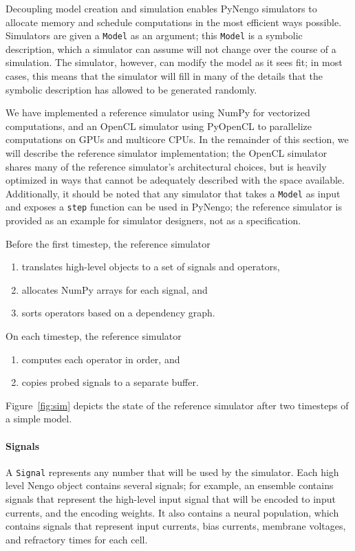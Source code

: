 \documentclass{frontiersSCNS}
\begin{document}
Decoupling model creation and simulation
enables PyNengo simulators
to allocate memory and schedule computations
in the most efficient ways possible.
Simulators are given a \texttt{Model}
as an argument;
this \texttt{Model} is a symbolic description,
which a simulator can assume will not change
over the course of a simulation.
The simulator, however,
can modify the model as it sees fit;
in most cases, this means that the simulator
will fill in many of the details
that the symbolic description
has allowed to be generated randomly.

We have implemented
a reference simulator using NumPy
for vectorized computations,
and an OpenCL simulator
using PyOpenCL to parallelize
computations on GPUs and multicore CPUs.
In the remainder of this section,
we will describe
the reference simulator implementation;
the OpenCL simulator shares many
of the reference simulator's architectural choices,
but is heavily optimized in ways
that cannot be adequately described
with the space available.
Additionally, it should be noted that
any simulator that takes a \texttt{Model}
as input and exposes a \texttt{step}
function can be used in PyNengo;
the reference simulator
is provided as an example
for simulator designers,
not as a specification.

Before the first timestep, the reference simulator
\begin{enumerate}
  \item translates high-level objects to
    a set of signals and operators,
  \item allocates NumPy arrays for each signal, and
  \item sorts operators based on a dependency graph.
\end{enumerate}
On each timestep, the reference simulator
\begin{enumerate}
  \item computes each operator in order, and
  \item copies probed signals to a separate buffer.
\end{enumerate}
Figure~\ref{fig:sim} depicts
the state of the reference simulator
after two timesteps of a simple model.

\paragraph{Signals}

A \texttt{Signal} represents any number that
will be used by the simulator.
Each high level Nengo object contains
several signals;
for example, an ensemble contains signals
that represent the high-level input
signal that will be encoded
to input currents,
and the encoding weights.
It also contains a neural population,
which contains signals that represent
input currents, bias currents,
membrane voltages, and refractory times for each cell.
\end{document}
